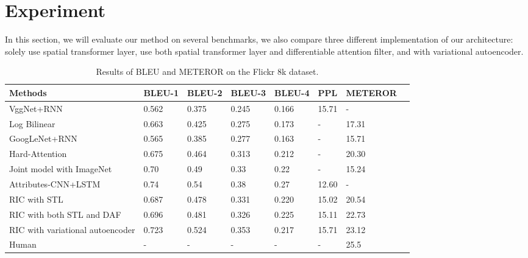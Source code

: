 \documentclass[10pt,twocolumn,letterpaper]{article}
\begin{document}
	\section{Experiment}
	\label{sec.exp}
	In this section, we will evaluate our method on several benchmarks,  we also compare three different implementation of our architecture:  solely use spatial transformer layer, use both spatial transformer layer and differentiable attention filter, and with variational autoencoder.
	\begin{table*}[]
		\centering
		
		\caption{Results of  BLEU \cite{papineni2002bleu} and METEROR \cite{banerjee2005meteor} on the Flickr 8k \cite{hodosh2013framing}  dataset. }
		\label{8k}
		\begin{tabular}{@{}llllllll@{}}
			\toprule
			Methods         &  BLEU-1   & BLEU-2   & BLEU-3  & BLEU-4 & PPL & METEROR\\ \midrule
			VggNet+RNN              & 0.562 & 0.375  & 0.245 & 0.166 &  15.71 & - &  \\
			Log Bilinear\cite{kiros2014multimodal}    & 0.663 &  0.425 & 0.275 & 0.173 & - & 17.31 &\\
			GoogLeNet+RNN           & 0.565 & 0.385 & 0.277 & 0.163 & - &  15.71 & \\
			Hard-Attention \cite{xu2015show}         & 0.675 & 0.464 & 0.313 & 0.212 & - & 20.30 &  \\
			Joint model with ImageNet \cite{pu2016variational}            & 0.70 & 0.49 & 0.33 & 0.22 & - & 15.24 &\\
			Attributes-CNN+LSTM \cite{wu2015value} &  0.74 & 0.54 & 0.38& 0.27 & 12.60 & -  \\
			RIC with STL & 0.687 & 0.478 & 0.331 & 0.220 & 15.02 & 20.54 & \\
			RIC with both STL and DAF   & 0.696 & 0.481 & 0.326 & 0.225 & 15.11 & 22.73  & \\
			RIC with variational autoencoder   & 0.723 & 0.524 & 0.353 & 0.217 & 15.71 & 23.12  & \\
			Human\cite{chen2014learning}  & - & - & - & - & - & 25.5 &\\  \bottomrule
		\end{tabular}
	\end{table*}
	
	
	
	
	
\end{document}
